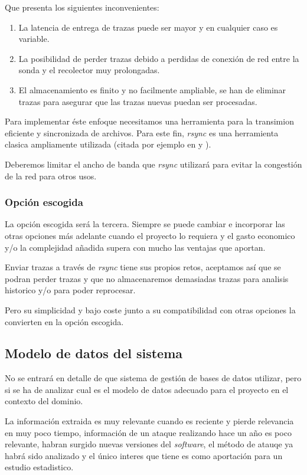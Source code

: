 Que presenta los siguientes inconvenientes:

\begin{enumerate}
    \item La latencia de entrega de trazas puede ser mayor y en cualquier caso es variable.
    \item La posibilidad de perder trazas debido a perdidas de conexión de red entre la sonda y el recolector muy prolongadas.
    \item El almacenamiento es finito y no facilmente ampliable, se han de eliminar trazas para asegurar que las trazas nuevas puedan
    ser procesadas.
\end{enumerate}

Para implementar éste enfoque necesitamos una herramienta para la transimion eficiente y sincronizada de archivos. Para este fin,
\emph{rsync} es una herramienta clasica ampliamente utilizada (citada por ejemplo en \cite{Ph.D.200301} y \cite{douglis2004web}).

Deberemos limitar el ancho de banda que \emph{rsync} utilizará para evitar la congestión de la red para otros usos.

\subsubsection{Opción escogida}

La opción escogida será la tercera. Siempre se puede cambiar e incorporar las otras opciones más adelante cuando el proyecto lo requiera y el gasto economico
y/o la complejidad añadida supera con mucho las ventajas que aportan.

Enviar trazas a través de \emph{rsync} tiene sus propios retos, aceptamos así que se podran perder trazas y que no almacenaremos
demasiadas trazas para analisis historico y/o para poder reprocesar.

Pero su simplicidad y bajo coste junto a su compatibilidad con otras opciones la convierten en la opción escogida.

\subsection{Modelo de datos del sistema}

No se entrará en detalle de que sistema de gestión de bases de datos utilizar, pero si  se ha de analizar cual es el modelo de datos
adecuado para el proyecto en el contexto del dominio.

La información extraida es muy relevante cuando es reciente y pierde relevancia en muy poco tiempo, información de un ataque realizando
hace un año es poco relevante, habran surgido nuevas versiones del \emph{software}, el método de atauqe ya habrá sido analizado y el único interes
que tiene es como aportación para un estudio estadistico.

